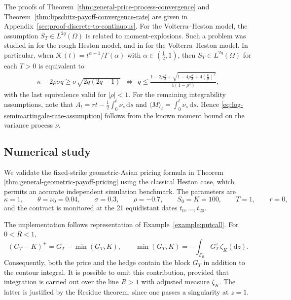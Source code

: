 \documentclass[10pt,a4paper,reqno]{amsart}
\theoremstyle{plain}
\theoremstyle{definition}
\theoremstyle{remark}
\theoremstyle{example}
\begin{document}
The proofs of Theorem~\ref{thm:general-price-process-convergence} and Theorem~\ref{thm:lipschitz-payoff-convergence-rate} are given in Appendix~\ref{sec:proof-discrete-to-continuous}.
For the Volterra--Heston model, the assumption $S_T \in L^{2q}(\Omega)$ is related to moment-explosions. Such a problem was studied in \cite{gerhold2019moment} for the rough Heston model, and in \cite{MR4099324} for the Volterra--Heston model. In particular, when $\mathcal{K}(t)= t^{\alpha-1}/\Gamma(\alpha)$ with $\alpha \in (\frac{1}{2},1)$, then $S_T \in L^{2q}(\Omega)$ for each $T > 0$ is equivalent to 
\begin{align}\label{eq: moment}
     \kappa - 2\rho \sigma q \geq \sigma \sqrt{2q(2q - 1)} \ \ \Longleftrightarrow \ \ q \leq \frac{1 - 2\rho \frac{\kappa}{\sigma} + \sqrt{1 - 4\rho \frac{\kappa}{\sigma} + 4 \left( \frac{\kappa}{\sigma}\right)^2} }{4(1- \rho^2) },
\end{align}
with the last equivalence valid for $|\rho| < 1$. For the remaining integrability assumptions, note that $A_t = rt - \frac{1}{2}\int_0^t \nu_s\, \mathrm{d}s$ and $\langle M \rangle_t = \int_0^t \nu_s\, \mathrm{d}s$. Hence \eqref{eq:log-semimartingale-rate-assumption} follows from the known moment bound on the variance process $\nu$. 



\subsection{Numerical study}\label{sec:numericspricing}

 We validate the fixed-strike geometric-Asian pricing formula in
Theorem~ \ref{thm:general-geometric-payoff-pricing} using the classical Heston case, which permits
an accurate independent simulation benchmark.  The parameters are
\[
 \kappa=1,\qquad \theta=\nu_0=0.04,\qquad \sigma=0.3,\qquad \rho=-0.7,
 \qquad S_0=K=100,\qquad T=1,\qquad r=0,
\]
and the contract is monitored at the 21 equidistant dates \(t_0,\ldots,t_{20}\).


The implementation follows representation of Example~\ref{example:putcall}. For \(0<R<1\),
\[
 (G_T-K)^+=G_T-\min(G_T,K),  \qquad  \min(G_T,K)=-\int_{\mathcal S_R}G_T^z\,\zeta_K(\mathrm dz).
\]
Consequently, both the price and the hedge contain the block $G_T$ in addition to the
contour integral. It is possible to omit this contribution, provided that integration is carried out over the line \(R>1\) with adjusted measure $\zeta_K$. The latter is justified by the Residue theorem, since one passes a singularity at $z = 1$. 
\end{document}
